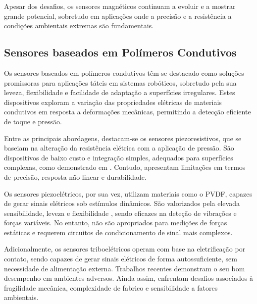 Apesar dos desafios, os sensores magnéticos continuam a evoluir e a mostrar grande potencial, sobretudo em aplicações onde a precisão e a resistência a condições ambientais extremas são fundamentais.

\subsection{Sensores baseados em Polímeros Condutivos}

Os sensores baseados em polímeros condutivos têm-se destacado como soluções promissoras para aplicações táteis em sistemas robóticos, sobretudo pela sua leveza, flexibilidade e facilidade de adaptação a superfícies irregulares. Estes dispositivos exploram a variação das propriedades elétricas de materiais condutivos em resposta a deformações mecânicas, permitindo a detecção eficiente de toque e pressão.

Entre as principais abordagens, destacam-se os sensores piezoresistivos, que se baseiam na alteração da resistência elétrica com a aplicação de pressão. São dispositivos de baixo custo e integração simples, adequados para superfícies complexas, como demonstrado em \cite{Canavese2014, Stassi2014}. Contudo, apresentam limitações em termos de precisão, resposta não linear e durabilidade.

Os sensores piezoelétricos, por sua vez, utilizam materiais como o \ac{PVDF}, capazes de gerar sinais elétricos sob estímulos dinâmicos. São valorizados pela elevada sensibilidade, leveza e flexibilidade \cite{Yin2023, Seminara2012}, sendo eficazes na deteção de vibrações e forças variáveis. No entanto, não são apropriados para medições de forças estáticas e requerem circuitos de condicionamento de sinal mais complexos.

Adicionalmente, os sensores triboelétricos operam com base na eletrificação por contato, sendo capazes de gerar sinais elétricos de forma autossuficiente, sem necessidade de alimentação externa. Trabalhos recentes \cite{Zhong2023, Tao2022} demonstram o seu bom desempenho em ambientes adversos. Ainda assim, enfrentam desafios associados à fragilidade mecânica, complexidade de fabrico e sensibilidade a fatores ambientais.



